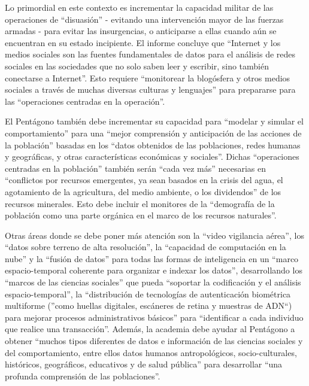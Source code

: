 \documentclass[10pt,a5paper,twoside,spanish,]{book}
\begin{document}
Lo primordial en este contexto es incrementar la capacidad militar de
las operaciones de ``disuasión'' - evitando una intervención mayor de
las fuerzas armadas - para evitar las insurgencias, o anticiparse a
ellas cuando aún se encuentran en su estado incipiente. El informe
concluye que ``Internet y los medios sociales son las fuentes
fundamentales de datos para el análisis de redes sociales en las
sociedades que no solo saben leer y escribir, sino también conectarse a
Internet''. Esto requiere ``monitorear la blogósfera y otros medios
sociales a través de muchas diversas culturas y lenguajes'' para
prepararse para las ``operaciones centradas en la operación''.

El Pentágono también debe incrementar su capacidad para ``modelar y
simular el comportamiento'' para una ``mejor comprensión y anticipación
de las acciones de la población'' basadas en los ``datos obtenidos de
las poblaciones, redes humanas y geográficas, y otras características
económicas y sociales''. Dichas ``operaciones centradas en la
población'' también serán ``cada vez más'' necesarias en ``conflictos
por recursos emergentes, ya sean basados en la crisis del agua, el
agotamiento de la agricultura, del medio ambiente, o los dividendos'' de
los recursos minerales. Esto debe incluir el monitores de la
``demografía de la población como una parte orgánica en el marco de los
recursos naturales''.

Otras áreas donde se debe poner más atención son la ``video vigilancia
aérea'', los ``datos sobre terreno de alta resolución'', la ``capacidad
de computación en la nube'' y la ``fusión de datos'' para todas las
formas de inteligencia en un ``marco espacio-temporal coherente para
organizar e indexar los datos'', desarrollando los ``marcos de las
ciencias sociales'' que pueda ``soportar la codificación y el análisis
espacio-temporal'', la ``distribución de tecnologías de autenticación
biométrica multiforme (''como huellas digitales, escáneres de retina y
muestras de ADN``) para mejorar procesos administrativos básicos'' para
``identificar a cada individuo que realice una transacción''. Además, la
academia debe ayudar al Pentágono a obtener ``muchos tipos diferentes de
datos e información de las ciencias sociales y del comportamiento, entre
ellos datos humanos antropológicos, socio-culturales, históricos,
geográficos, educativos y de salud pública'' para desarrollar ``una
profunda comprensión de las poblaciones''.
\end{document}
